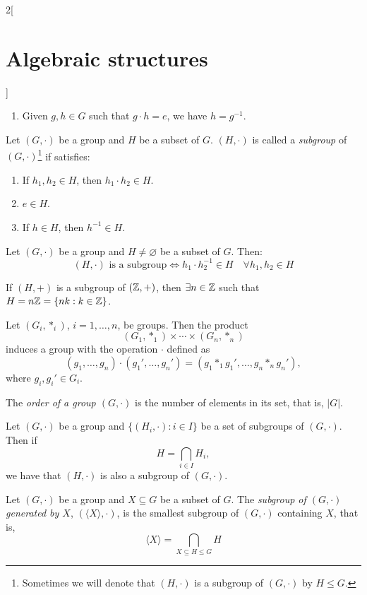 \documentclass[../../../main.tex]{subfiles}
\begin{document}
\begin{multicols}{2}[\section{Algebraic structures}]
\begin{lemma}
\begin{enumerate}
            \item Given $g,h\in G$ such that $g\cdot h=e$, we have $h=g^{-1}$.
        \end{enumerate}
    \end{lemma}
    \begin{definition}[Subgroup]
        Let $(G,\cdot)$ be a group and $H$ be a subset of $G$. $(H,\cdot)$ is called a \textit{subgroup} of $(G,\cdot)$\footnote{Sometimes we will denote that $(H,\cdot)$ is a subgroup of $(G,\cdot)$ by $H\leq G$.} if satisfies:
        \begin{enumerate}
            \item If $h_1,h_2\in H$, then $h_1\cdot h_2\in H$.
            \item $e\in H$.
            \item If $h\in H$, then $h^{-1}\in H$.
        \end{enumerate}
    \end{definition}
    \begin{prop}
        Let $(G,\cdot)$ be a group and $H\ne\varnothing$ be a subset of $G$. Then: $$(H,\cdot)\text{ is a subgroup}\iff h_1\cdot h_2^{-1}\in H\quad\forall h_1,h_2\in H$$
    \end{prop}
    \begin{prop}
        If $(H,+)$ is a subgroup of $(\mathbb{Z} ,+)$, then $\exists n\in\mathbb{Z} $ such that $H=n\mathbb{Z} =\{nk:k\in\mathbb{Z} \}$.
    \end{prop}
    \begin{prop}
        Let $(G_i,*_i)$, $i=1,\ldots, n$, be groups. Then the product $$(G_1,*_1)\times\cdots\times(G_n,*_n)$$ induces a group with the operation $\cdot$ defined as $$(g_1,\ldots,g_n)\cdot(g_1',\ldots,g_n')=(g_1*_1g_1',\ldots,g_n*_ng_n'),$$ where $g_i,g_i'\in G_i$.
    \end{prop}
    \begin{definition}
        The \textit{order of a group $(G,\cdot)$} is the number of elements in its set, that is, $|G|$.
    \end{definition}
    \begin{lemma}
        Let $(G,\cdot)$ be a group and $\{(H_i,\cdot):i\in I\}$ be a set of subgroups of $(G,\cdot)$. Then if $$H=\displaystyle\bigcap_{i\in I}H_i,$$ we have that $(H,\cdot)$ is also a subgroup of $(G,\cdot)$.
    \end{lemma}
    \begin{definition}
        Let $(G,\cdot)$ be a group and $X\subseteq G$ be a subset of $G$. The \textit{subgroup of $(G,\cdot)$ generated by $X$}, $(\langle X\rangle,\cdot)$, is the smallest subgroup of $(G,\cdot)$ containing $X$, that is, $$\langle X\rangle=\bigcap_{X\subseteq H\leq G}H$$

\end{definition}
\end{multicols}
\end{document}
